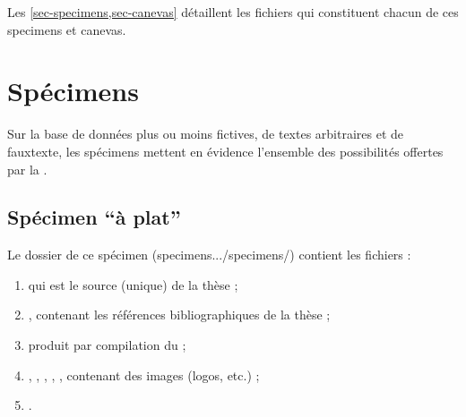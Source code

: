 Les \vref{sec-specimens,sec-canevas} détaillent les fichiers qui constituent
chacun de ces specimens et canevas.




\section{Spécimens}
\label{sec-specimens}

Sur la base de données plus ou moins fictives, de textes arbitraires et de
\gls{fauxtexte}, les spécimens mettent en évidence l'ensemble des possibilités
offertes par la \yatcl{}.

\subsection{Spécimen \enquote{à plat}}
\label{sec-specimen-a-plat}

\def\folder{specimens}
\def\subfolder{a-plat}

Le dossier de ce spécimen (\folder{.../\folder/}\subdirectorytree{}) contient
les fichiers :
\begin{enumerate}
\item {} qui est le source  (unique) de la thèse ;
\item {}, contenant les références bibliographiques de
  la thèse ;
\item {} produit par compilation du  ;
\item {}, , , ,
  , contenant des images (logos, etc.) ;
\item {}\latexmkrc.
\end{enumerate}

